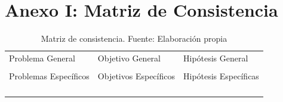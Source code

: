 \chapter{Anexo I: Matriz de Consistencia}


\begin{table}[h!]
	\centering
	\small
	\begin{tabular}{ |m{5cm}|m{5cm}|m{5cm}|  }
		\hline
		\rowcolor{bluejean}
		\Centering \color{white}{PROBLEMAS}& \Centering \color{white}{OBJETIVOS}& \Centering \color{white}{HIPÓTESIS}\\
		\hline
		\rowcolor{turq}
		\Centering Problema General& \Centering Objetivo General & \Centering Hipótesis General \\
		\hline
		{\ProblemaGeneral} & { \ObjetivoGeneral} & {\HipotesisGeneral} \\
		\hline
		\rowcolor{turq}
		\Centering Problemas Específicos& \Centering Objetivos Específicos & \Centering Hipótesis Específicas \\
		\hline
		{\Pbone} & {\Objone} & {\Hone} \\
		\hline
		{\Pbtwo} & {\Objtwo} & {\Htwo} \\
		\hline
		{\Pbthree} & {\Objthree} & {\Hthree} \\
		\hline
		{\Pbfour} & {\Objfour} & {\Hfour} \\
		\hline

	\end{tabular}
	\caption{Matriz de consistencia. Fuente: Elaboración propia}
	\label{1:table}

	


\end{table}

